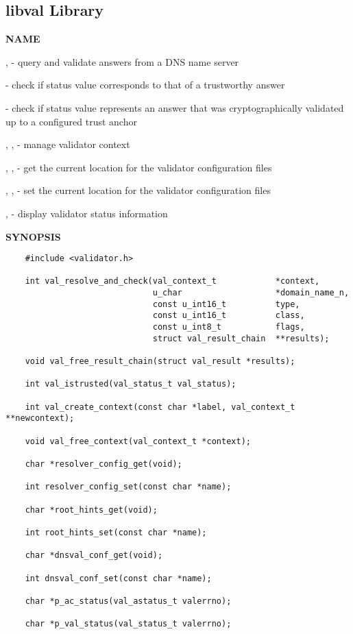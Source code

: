 \clearpage

\subsection{\bf libval Library}

{\bf NAME}

,  - query
and validate answers from a DNS name server

 - check if status value corresponds to that of a
trustworthy answer

 - check if status value represents an
answer that was cryptographically validated up to a configured
trust anchor

, ,
 - manage validator context

, ,
 - get the current location for the validator
configuration files

, ,
 - set the current location for the validator
configuration files

,  - display validator status
information

{\bf SYNOPSIS}

\begin{verbatim}
    #include <validator.h>

    int val_resolve_and_check(val_context_t            *context,
                              u_char                   *domain_name_n,
                              const u_int16_t          type,
                              const u_int16_t          class,
                              const u_int8_t           flags,
                              struct val_result_chain  **results);

    void val_free_result_chain(struct val_result *results);

    int val_istrusted(val_status_t val_status);

    int val_create_context(const char *label, val_context_t **newcontext);

    void val_free_context(val_context_t *context);

    char *resolver_config_get(void);

    int resolver_config_set(const char *name);

    char *root_hints_get(void);

    int root_hints_set(const char *name);

    char *dnsval_conf_get(void);

    int dnsval_conf_set(const char *name);

    char *p_ac_status(val_astatus_t valerrno);

    char *p_val_status(val_status_t valerrno);
\end{verbatim}


